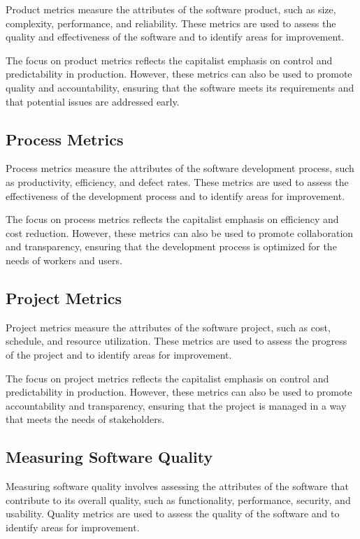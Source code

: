 \begin{refsection}
\begin{multicols}{2}
{Product metrics measure the attributes of the software product, such as size, complexity, performance, and reliability. These metrics are used to assess the quality and effectiveness of the software and to identify areas for improvement.

The focus on product metrics reflects the capitalist emphasis on control and predictability in production. However, these metrics can also be used to promote quality and accountability, ensuring that the software meets its requirements and that potential issues are addressed early.

\subsection{Process Metrics}

Process metrics measure the attributes of the software development process, such as productivity, efficiency, and defect rates. These metrics are used to assess the effectiveness of the development process and to identify areas for improvement.

The focus on process metrics reflects the capitalist emphasis on efficiency and cost reduction. However, these metrics can also be used to promote collaboration and transparency, ensuring that the development process is optimized for the needs of workers and users.

\subsection{Project Metrics}

Project metrics measure the attributes of the software project, such as cost, schedule, and resource utilization. These metrics are used to assess the progress of the project and to identify areas for improvement.

The focus on project metrics reflects the capitalist emphasis on control and predictability in production. However, these metrics can also be used to promote accountability and transparency, ensuring that the project is managed in a way that meets the needs of stakeholders.

\subsection{Measuring Software Quality}

Measuring software quality involves assessing the attributes of the software that contribute to its overall quality, such as functionality, performance, security, and usability. Quality metrics are used to assess the quality of the software and to identify areas for improvement.

}
\end{multicols}
\end{refsection}
